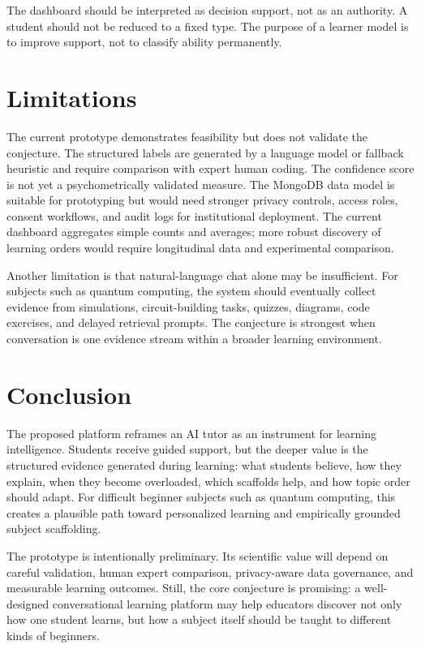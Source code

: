 \documentclass[11pt]{article}
\begin{document}
The dashboard should be interpreted as decision support, not as an authority. A student should not be reduced to a fixed type. The purpose of a learner model is to improve support, not to classify ability permanently.

\section{Limitations}

The current prototype demonstrates feasibility but does not validate the conjecture. The structured labels are generated by a language model or fallback heuristic and require comparison with expert human coding. The confidence score is not yet a psychometrically validated measure. The MongoDB data model is suitable for prototyping but would need stronger privacy controls, access roles, consent workflows, and audit logs for institutional deployment. The current dashboard aggregates simple counts and averages; more robust discovery of learning orders would require longitudinal data and experimental comparison.

Another limitation is that natural-language chat alone may be insufficient. For subjects such as quantum computing, the system should eventually collect evidence from simulations, circuit-building tasks, quizzes, diagrams, code exercises, and delayed retrieval prompts. The conjecture is strongest when conversation is one evidence stream within a broader learning environment.

\section{Conclusion}

The proposed platform reframes an AI tutor as an instrument for learning intelligence. Students receive guided support, but the deeper value is the structured evidence generated during learning: what students believe, how they explain, when they become overloaded, which scaffolds help, and how topic order should adapt. For difficult beginner subjects such as quantum computing, this creates a plausible path toward personalized learning and empirically grounded subject scaffolding.

The prototype is intentionally preliminary. Its scientific value will depend on careful validation, human expert comparison, privacy-aware data governance, and measurable learning outcomes. Still, the core conjecture is promising: a well-designed conversational learning platform may help educators discover not only how one student learns, but how a subject itself should be taught to different kinds of beginners.
\end{document}
